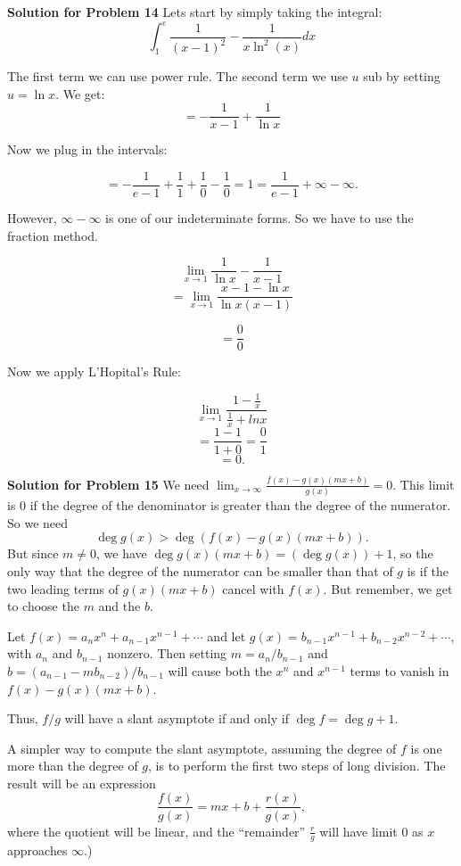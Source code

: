 \documentclass{article}
\begin{document}
\vspace{1cm}


\textbf{Solution for Problem 14} Lets start by simply taking the integral:
\[\displaystyle \int_{1}^{e} \frac {1} {\left( x - 1 \right)^{2}} - \frac {1} {x\ln^{2} \left( x \right)} dx\]

The first term we can use power rule. The second term we use $u$ sub by setting $u = \ln{x}$. We get:
\[= -\frac {1} {x - 1} + \frac {1} {\ln {x}}\]

Now we plug in the intervals:

\[= -\frac {1} {e - 1} + \frac {1} {1} + \frac {1} {0} - \frac {1} {0} = 1 = \frac {1} {e - 1} + \infty - \infty.\]

However, $\infty - \infty$ is one of our indeterminate forms. So we have to use the fraction method.

\[\lim_{x \to 1} \frac {1} {\ln{x}} - \frac {1} {x - 1}\]
\[= \lim_{x \to 1} \frac {x - 1 - \ln{x}} {\ln{x}\left( x - 1 \right)}\]

\[= \frac {0} {0}\]

Now we apply L'Hopital's Rule:

\[\lim_{x \to 1} \frac {1 - \frac {1} {x}} {\frac {1} {x} + 
ln{x}}\]
\[= \frac {1 - 1} {1 + 0} = \frac {0} {1}\]
\[= \boxed{0}.\]

\vspace{1cm}


\textbf{Solution for Problem 15} We need $\displaystyle \lim_{x \rightarrow \infty} \frac{f(x) - g(x)(mx+b)}{g(x)} = 0$. This limit is 0 if the degree of the denominator is greater than the degree of the numerator. So we need
\[
\deg g(x) > \deg(f(x) - g(x)(mx+b)).
\]But since $m \not= 0$, we have $\deg g(x)(mx+b) = (\deg g(x)) + 1$, so the only way that the degree of the numerator can be smaller than that of $g$ is if the two leading terms of $g(x)(mx+b)$ cancel with $f(x)$. But remember, we get to choose the $m$ and the $b$.

Let $f(x) = a_nx^n + a_{n-1}x^{n-1} + \cdots$ and let $g(x) = b_{n-1}x^{n-1} + b_{n-2}x^{n-2} + \cdots$, with $a_n$ and $b_{n-1}$ nonzero. Then setting $m = a_n/b_{n-1}$ and $b = (a_{n-1}-mb_{n-2})/b_{n-1}$ will cause both the $x^n$ and $x^{n-1}$ terms to vanish in $f(x) - g(x)(mx+b)$.

Thus, $f/g$ will have a slant asymptote if and only if $\deg f = \deg g + 1$.

A simpler way to compute the slant asymptote, assuming the degree of $f$ is one more than the degree of $g$, is to perform the first two steps of long division. The result will be an expression
\[
\frac{f(x)}{g(x)}=mx+b+\frac{r(x)}{g(x)},
\]where the quotient will be linear, and the ``remainder'' $\tfrac rg$ will have limit 0 as $x$ approaches $\infty$.)\\

\vspace{1cm}
\end{document}
